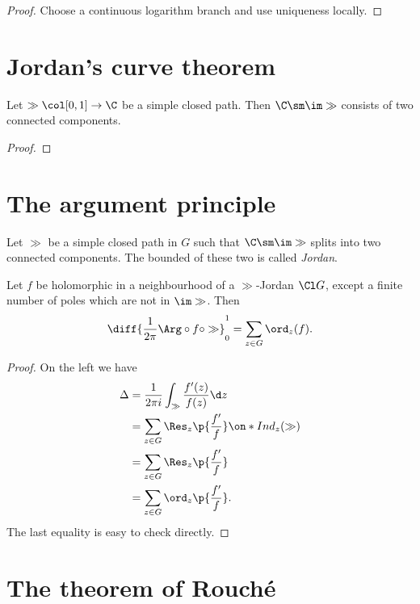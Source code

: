 \begin{proof}
  Choose a continuous logarithm branch and use uniqueness locally.
\end{proof}

\section{Jordan's curve theorem}

\begin{theorem}
  Let $\gg \col [0, 1] \to \C$ be a simple closed path. Then $\C \sm \im \gg$ consists of two connected components.
\end{theorem}

\begin{proof}
  
\end{proof}

\section{The argument principle}

\begin{definition}
  Let $\gg$ be a simple closed path in $G$ such that $\C \sm \im \gg$ splits into two connected components. The bounded of these two is called \emph{Jordan}.
\end{definition}

\begin{theorem}
  Let $f$ be holomorphic in a neighbourhood of a $\gg$-Jordan $\Cl G$, except a finite number of poles which are not in $\im \gg$. Then
  $$  \diff{\frac{1}{2 \pi} \Arg \circ f \circ \gg}_0^1 = \sum_{z \in G} \ord_{z}(f). $$
\end{theorem}

\begin{proof}
  On the left we have
  \begin{align*}
    \Delta
    &= \frac{1}{2 \pi i} \int_\gg \frac{f'(z)}{f(z)} \d z \\
    &= \sum_{z \in G} \Res_z\p{\frac{f'}{f}} \Ind_z(\gg) \\
    &= \sum_{z \in G} \Res_z\p{\frac{f'}{f}} \\
    &= \sum_{z \in G} \ord_z\p{\frac{f'}{f}}.
  \end{align*}
  The last equality is easy to check directly.
\end{proof}

\section{The theorem of Rouché}

